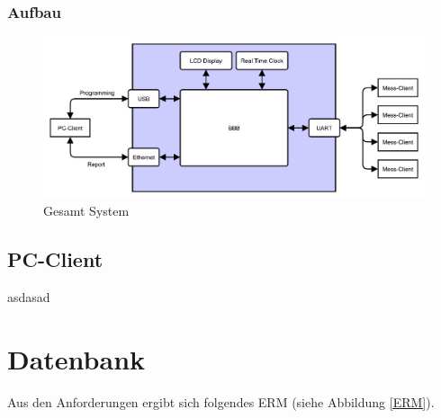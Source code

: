 \subsubsection{Aufbau}


\begin{figure}[H]
\begin{center}
\includegraphics[width=\textwidth]{img/general/UebersichtMaster.pdf}
\caption{Gesamt System}
\label{Gesamt_System}
\end{center}
\end{figure}



\newpage
\subsection{PC-Client}
\label{section_Verwaltung}
asdasad

\newpage



\newpage
\section{Datenbank}
\label{section_EntwurfDatenbank}

Aus den Anforderungen ergibt sich folgendes \ac{ERM} (siehe Abbildung \ref{ERM}). \\

